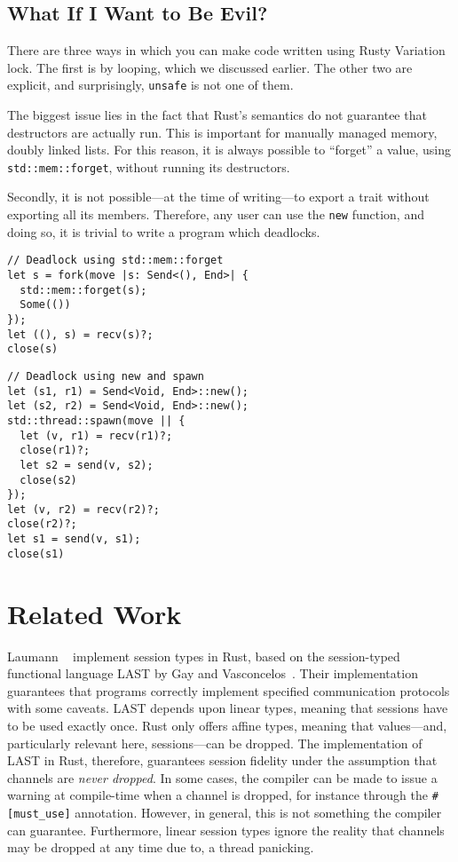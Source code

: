 \documentclass[copyright,creativecommons]{eptcs}
\begin{document}
\subsection{What If I Want to Be Evil?}\label{sec:limitations}
There are three ways in which you can make code written using Rusty Variation lock. The first is by looping, which we discussed earlier. The other two are explicit, and surprisingly, \lstinline{unsafe} is not one of them.

The biggest issue lies in the fact that Rust's semantics do not guarantee that destructors are actually run. This is important for manually managed memory, \eg doubly linked lists. For this reason, it is always possible to ``forget'' a value, using \lstinline{std::mem::forget}, without running its destructors.

Secondly, it is not possible---at the time of writing---to export a trait without exporting all its members. Therefore, any user can use the \lstinline{new} function, and doing so, it is trivial to write a program which deadlocks.

\begin{minipage}[t]{0.5\linewidth}
\begin{lstlisting}
// Deadlock using std::mem::forget
let s = fork(move |s: Send<(), End>| {
  std::mem::forget(s);
  Some(())
});
let ((), s) = recv(s)?;
close(s)
\end{lstlisting}
\end{minipage}%
\begin{minipage}[t]{0.5\linewidth}
\begin{lstlisting}
// Deadlock using new and spawn
let (s1, r1) = Send<Void, End>::new();
let (s2, r2) = Send<Void, End>::new();
std::thread::spawn(move || {
  let (v, r1) = recv(r1)?;
  close(r1)?;
  let s2 = send(v, s2);
  close(s2)
});
let (v, r2) = recv(r2)?;
close(r2)?;
let s1 = send(v, s1);
close(s1)
\end{lstlisting}
\end{minipage}

\section{Related Work}\label{sec:related-work}
Laumann \etal~\cite{jespersen2015} implement session types in Rust, based on the session-typed functional language LAST by Gay and Vasconcelos~\cite{gay2009}. Their implementation guarantees that programs correctly implement specified communication protocols with some caveats. LAST depends upon linear types, meaning that sessions have to be used exactly once. Rust only offers affine types, meaning that  values---and, particularly relevant here, sessions---can be dropped. The implementation of LAST in Rust, therefore, guarantees session fidelity under the assumption that channels are \emph{never dropped}. In some cases, the compiler can be made to issue a warning at compile-time when a channel is dropped, for instance through the \lstinline{#[must_use]} annotation. However, in general, this is not something the compiler can guarantee. Furthermore, linear session types ignore the reality that channels may be dropped at any time due to, \eg a thread panicking.
\end{document}
